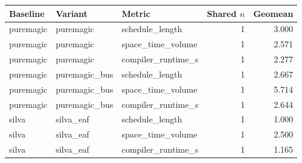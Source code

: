 \begin{tabular}{lllrr}
\hline
Baseline & Variant & Metric & Shared $n$ & Geomean \\
\hline
puremagic & puremagic & schedule\_length & 1 & 3.000 \\
puremagic & puremagic & space\_time\_volume & 1 & 2.571 \\
puremagic & puremagic & compiler\_runtime\_s & 1 & 2.277 \\
puremagic & puremagic\_bus & schedule\_length & 1 & 2.667 \\
puremagic & puremagic\_bus & space\_time\_volume & 1 & 5.714 \\
puremagic & puremagic\_bus & compiler\_runtime\_s & 1 & 2.644 \\
silva & silva\_eaf & schedule\_length & 1 & 1.000 \\
silva & silva\_eaf & space\_time\_volume & 1 & 2.500 \\
silva & silva\_eaf & compiler\_runtime\_s & 1 & 1.165 \\
\hline
\end{tabular}
